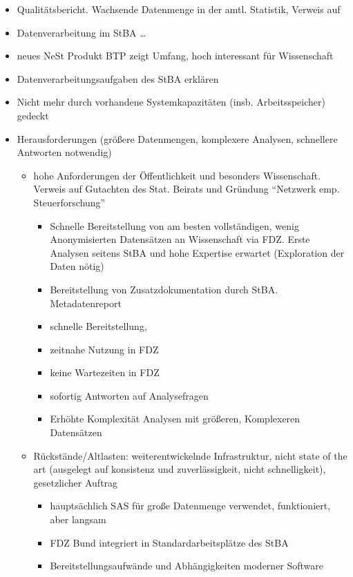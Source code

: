 \documentclass[
  german,
  10pt,
  twoside]{article}
\providecommand{\tightlist}{%
  \setlength{\itemsep}{0pt}\setlength{\parskip}{0pt}}
\begin{document}
\begin{itemize}
\item
  Qualitätsbericht. Wachsende Datenmenge in der amtl. Statistik, Verweis
  auf \autocite{destatis2023}
\item
  Datenverarbeitung im StBA \ldots{}
\item
  neues NeSt Produkt BTP zeigt Umfang, hoch interessant für Wissenschaft
\item
  Datenverarbeitungsaufgaben des StBA erklären
\item
  Nicht mehr durch vorhandene Systemkapazitäten (insb. Arbeitsspeicher)
  gedeckt
\item
  Herausforderungen (größere Datenmengen, komplexere Analysen,
  schnellere Antworten notwendig)

  \begin{itemize}
  \tightlist
  \item
    hohe Anforderungen der Öffentlichkeit und besonders Wissenschaft.
    Verweis auf Gutachten des Stat. Beirats und Gründung ``Netzwerk emp.
    Steuerforschung''

    \begin{itemize}
    \tightlist
    \item
      Schnelle Bereitstellung von am besten vollständigen, wenig
      Anonymisierten Datensätzen an Wissenschaft via FDZ. Erste Analysen
      seitens StBA und hohe Expertise erwartet (Exploration der Daten
      nötig)
    \item
      Bereitstellung von Zusatzdokumentation durch StBA. Metadatenreport
    \item
      schnelle Bereitstellung,
    \item
      zeitnahe Nutzung in FDZ
    \item
      keine Wartezeiten in FDZ
    \item
      sofortig Antworten auf Analysefragen
    \item
      Erhöhte Komplexität Analysen mit größeren, Komplexeren Datensätzen
    \end{itemize}
  \item
    Rückstände/Altlasten: weiterentwickelnde Infrastruktur, nicht state
    of the art (ausgelegt auf konsistenz und zuverlässigkeit, nicht
    schnelligkeit), gesetzlicher Auftrag

    \begin{itemize}
    \tightlist
    \item
      hauptsächlich SAS für große Datenmenge verwendet, funktioniert,
      aber langsam
    \item
      FDZ Bund integriert in Standardarbeitsplätze des StBA
    \item
      Bereitstellungsaufwände und Abhängigkeiten moderner Software
    \end{itemize}
  \end{itemize}
\end{itemize}
\end{document}
